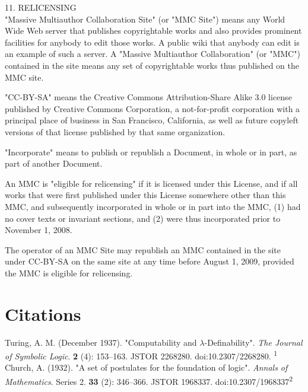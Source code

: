 \documentclass[oneside,12pt]{memoir} %
\begin{document}
11. RELICENSING\\

"Massive Multiauthor Collaboration Site" (or "MMC Site") means any World Wide Web server that publishes copyrightable works and also provides prominent facilities for anybody to edit those works. A public wiki that anybody can edit is an example of such a server. A "Massive Multiauthor Collaboration" (or "MMC") contained in the site means any set of copyrightable works thus published on the MMC site.

"CC-BY-SA" means the Creative Commons Attribution-Share Alike 3.0 license published by Creative Commons Corporation, a not-for-profit corporation with a principal place of business in San Francisco, California, as well as future copyleft versions of that license published by that same organization.

"Incorporate" means to publish or republish a Document, in whole or in part, as part of another Document.

An MMC is "eligible for relicensing" if it is licensed under this License, and if all works that were first published under this License somewhere other than this MMC, and subsequently incorporated in whole or in part into the MMC, (1) had no cover texts or invariant sections, and (2) were thus incorporated prior to November 1, 2008.

The operator of an MMC Site may republish an MMC contained in the site under CC-BY-SA on the same site at any time before August 1, 2009, provided the MMC is eligible for relicensing.


\chapter{Citations}

 Turing, A. M. (December 1937). "Computability and \ensuremath{\lambda}-Definability". \emph{The Journal of Symbolic Logic}. \textbf{2} (4): 153–163. JSTOR 2268280. doi:10.2307/2268280. \textsuperscript{1}\\
 
  Church, A. (1932). "A set of postulates for the foundation of logic". \emph{Annals of Mathematics}. Series 2. \textbf{33} (2): 346–366. JSTOR 1968337. doi:10.2307/1968337\textsuperscript{2}
  
 
\end{document}
